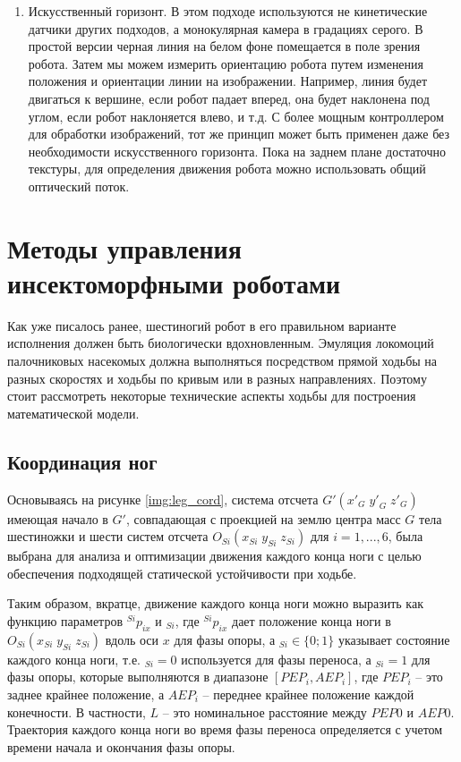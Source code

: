\begin{enumerate}
	\item Искусственный горизонт. В этом подходе используются не кинетические датчики других подходов, а монокулярная камера в градациях серого. В простой версии черная линия на белом фоне помещается в поле зрения робота. Затем мы можем измерить ориентацию робота путем изменения положения и ориентации линии на изображении. Например, линия будет двигаться к вершине, если робот падает вперед, она будет наклонена под углом, если робот наклоняется влево, и т.д. С более мощным контроллером для обработки изображений, тот же принцип может быть применен даже без необходимости искусственного горизонта. Пока на заднем плане достаточно текстуры, для определения движения робота можно использовать общий оптический поток.
\end{enumerate}

\section{Методы управления инсектоморфными роботами}

Как уже писалось ранее, шестиногий робот в его правильном варианте исполнения должен быть биологически вдохновленным. Эмуляция локомоций палочниковых насекомых должна выполняться посредством прямой ходьбы на разных скоростях и ходьбы по кривым или в разных направлениях. Поэтому стоит рассмотреть некоторые технические аспекты ходьбы для построения математической модели.

\subsection{Координация ног}

Основываясь на рисунке \ref{img:leg_cord}, система отсчета $G'({x'}_G\;{y'}_G\;{z'}_G)$ имеющая начало в $G'$, совпадающая с проекцией на землю центра масс $G$ тела шестиножки и шести систем отсчета $O_{Si}(x_{Si}\;y_{Si}\;z_{Si})$ для $i=1,...,6$, была выбрана для анализа и оптимизации движения каждого конца ноги с целью обеспечения подходящей статической устойчивости при ходьбе.

Таким образом, вкратце, движение каждого конца ноги можно выразить как функцию параметров $^{Si}p_{ix}$ и $_{Si}$, где $^{Si}p_{ix}$ дает положение конца ноги в $O_{Si}(x_{Si}\;y_{Si}\;z_{Si})$ вдоль оси $x$ для фазы опоры, а $_{Si}\in\{0;1\}$  указывает состояние каждого конца ноги, т.е. $_{Si} = 0$ используется для фазы переноса, а $_{Si} = 1$ для фазы опоры, которые выполняются в диапазоне $[PEP_i,AEP_i]$, где $PEP_i$ – это заднее крайнее положение, а $AEP_i$ – переднее крайнее положение каждой конечности. В частности, $L$ – это номинальное расстояние между $PEP0$ и $AEP0$. Траектория каждого конца ноги во время фазы переноса определяется с учетом времени начала и окончания фазы опоры.


